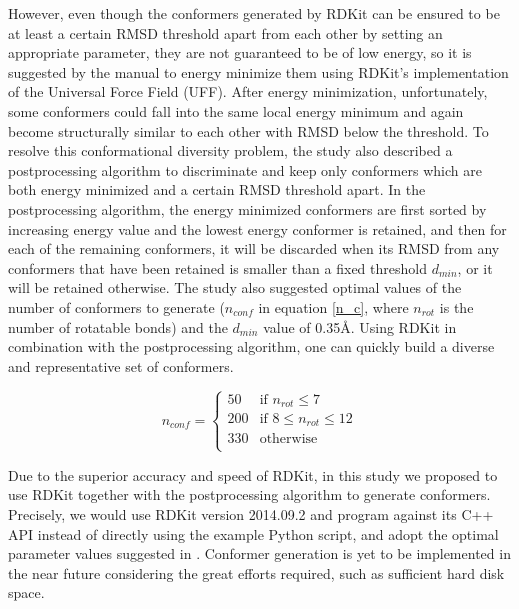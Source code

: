 \documentclass[a4,center,fleqn]{NAR}
\begin{document}
However, even though the conformers generated by RDKit can be ensured to be at least a certain RMSD threshold apart from each other by setting an appropriate parameter, they are not guaranteed to be of low energy, so it is suggested by the manual to energy minimize them using RDKit's implementation of the Universal Force Field (UFF). After energy minimization, unfortunately, some conformers could fall into the same local energy minimum and again become structurally similar to each other with RMSD below the threshold. To resolve this conformational diversity problem, the study \cite{1127} also described a postprocessing algorithm to discriminate and keep only conformers which are both energy minimized and a certain RMSD threshold apart. In the postprocessing algorithm, the energy minimized conformers are first sorted by increasing energy value and the lowest energy conformer is retained, and then for each of the remaining conformers, it will be discarded when its RMSD from any conformers that have been retained is smaller than a fixed threshold $d_{min}$, or it will be retained otherwise. The study \cite{1127} also suggested optimal values of the number of conformers to generate ($n_{conf}$ in equation \eqref{n_c}, where $n_{rot}$ is the number of rotatable bonds) and the $d_{min}$ value of 0.35\AA. Using RDKit in combination with the postprocessing algorithm, one can quickly build a diverse and representative set of conformers.

\begin{equation}
n_{conf}=
\begin{cases}
 50 & \text{if } n_{rot} \leq 7\\
200 & \text{if } 8 \leq n_{rot} \leq 12\\
330 & \text{otherwise}\\
\end{cases}
\label{n_c}
\end{equation}

Due to the superior accuracy and speed of RDKit, in this study we proposed to use RDKit together with the postprocessing algorithm to generate conformers. Precisely, we would use RDKit version 2014.09.2 and program against its C++ API instead of directly using the example Python script, and adopt the optimal parameter values suggested in \cite{1127}. Conformer generation is yet to be implemented in the near future considering the great efforts required, such as sufficient hard disk space.%
\end{document}
